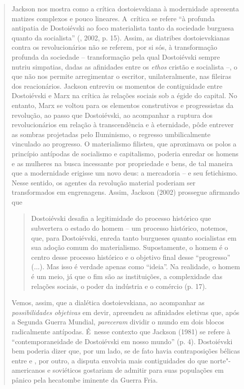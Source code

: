 {\begin{quote}
Jackson nos mostra como a crítica dostoievskiana à modernidade apresenta
matizes complexos e pouco lineares. A~crítica se refere ``à profunda
antipatia de Dostoiévski ao foco materialista tanto da sociedade
burguesa quanto da socialista'' (, 2002, p. 15). Assim, as
diatribes dostoievskianas contra os revolucionários não se referem, por
si sós, à transformação profunda da sociedade -- transformação pela qual
Dostoiévski sempre nutriu simpatias, dadas as afinidades entre os
\emph{ethos} cristão e socialista --, o que não nos permite arregimentar
o escritor, unilateralmente, nas fileiras dos reacionários. Jackson
entreviu os momentos de contiguidade entre Dostoiévski e Marx na crítica
às relações sociais sob a égide do capital. No entanto, Marx se voltou
para os elementos construtivos e progressistas da revolução, ao passo
que Dostoiévski, ao acompanhar a ruptura dos revolucionários em relação
à transcendência e à eternidade, pôde entrever as sombras projetadas
pelo Iluminismo, o regresso umbilicalmente vinculado ao progresso. O
materialismo filisteu, que aproximava os polos a princípio antípodas de
socialismo e capitalismo, poderia enredar os homens e as mulheres na
busca incessante por propriedade e bens, de tal maneira que a
modernidade erigisse um novo deus: a mercadoria -- e seu fetichismo.
Nesse sentido, os agentes da revolução material poderiam ser
transformados em engrenagens. Assim, Jackson (2002) prossegue afirmando
que

\begin{quote}
Dostoiévski desafia a legitimidade do processo histórico que subvertera
o estado do homem -- um processo histórico, notemos, que, para
Dostoiévski, enreda tanto burgueses quanto socialistas em sua adoção
comum do materialismo. Supostamente, o homem é o centro desse processo
histórico e o objetivo final desse ``progresso'' (...). Mas isso é
verdade apenas como ``ideia''. Na realidade, o homem é um meio, já que o
fim são as instituições, a complexidade das relações sociais, o poder da
indústria e o comércio (p. 17).
\end{quote}

Vemos, assim, que a dialética dostoievskiana, ao acompanhar as
\emph{possibilidades objetivas} em devir, apreendeu as afinidades
eletivas que, após a Segunda Guerra Mundial, \emph{pareceram} dividir o
mundo em dois blocos radicalmente antípodas. É~nesse contexto que
Jackson (1981) se refere à ``contemporaneidade de Dostoiévski em nosso
mundo'' (p. 4). Dostoiévski bem poderia dizer que, por um lado, se de
fato havia contraposições bélicas entre  e , por outro, a disputa
envolvia mais contiguidades do que norte"-americanos e soviéticos
gostariam de admitir para suas populações em pânico pela hecatombe
iminente da Guerra Fria.


\end{quote}}
